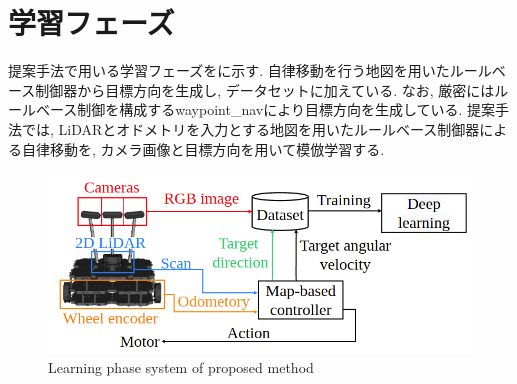 
\section{学習フェーズ}
提案手法で用いる学習フェーズをに示す. 自律移動を行う地図を用いたルールベース制御器から目標方向を生成し, データセットに加えている. 
なお, 厳密にはルールベース制御を構成するwaypoint\_navにより目標方向を生成している. 
提案手法では, 
LiDARとオドメトリを入力とする地図を用いたルールベース制御器による自律移動を, カメラ画像と目標方向を用いて模倣学習する.

\vspace{3cm}

\begin{figure}[hbtp]
  \centering
 \includegraphics[keepaspectratio, scale=0.45]
      {images/suggest_learning_sys.png}
 \caption{Learning phase system of proposed method}
 \label{Fig:suggest_learning_sys}
\end{figure}


\newpage
